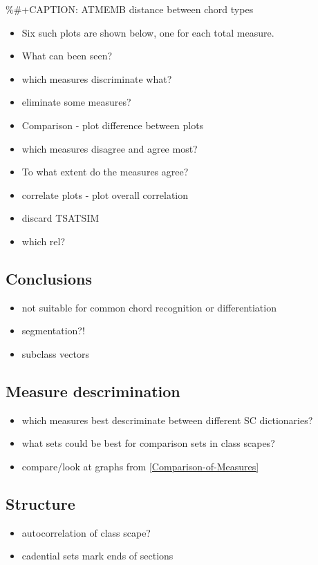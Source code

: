 \documentclass{article}
\begin{document}
\%\#+CAPTION: ATMEMB distance between chord types
\begin{itemize}
\item Six such plots are shown below, one for each total measure.
\item What can been seen?
\item which measures discriminate what?
\item eliminate some measures?
\item Comparison - plot difference between plots
\item which measures disagree and agree most?
\item To what extent do the measures agree?
\item correlate plots - plot overall correlation
\item discard TSATSIM
\item which rel?
\end{itemize}
\subsection{Conclusions}
\label{sec-7-4}

\begin{itemize}
\item not suitable for common chord recognition or differentiation
\item segmentation?!
\item subclass vectors
\end{itemize}
\subsection{Measure descrimination}
\label{sec-7-5}

\begin{itemize}
\item which measures best descriminate between different SC dictionaries?
\item what sets could be best for comparison sets in class scapes?
\item compare/look at graphs from \ref{Comparison-of-Measures}
\end{itemize}
\subsection{Structure}
\label{sec-7-6}

\begin{itemize}
\item autocorrelation of class scape?
\item cadential sets mark ends of sections
\end{itemize}
\end{document}
